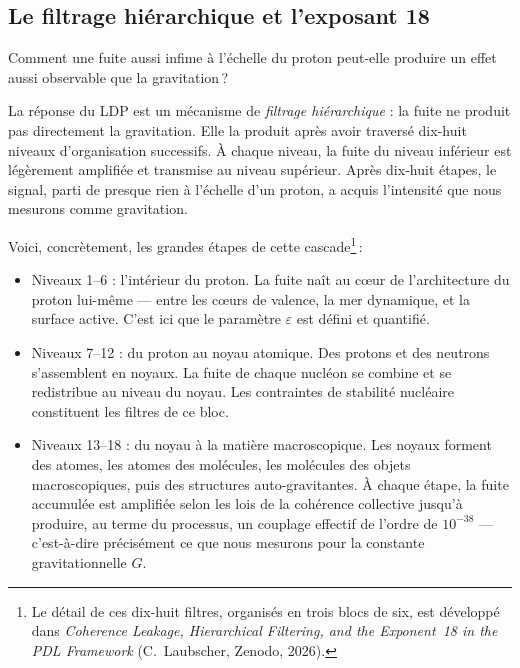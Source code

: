 \documentclass[12pt, a4paper, openright]{book}
\begin{document}
\subsection*{Le filtrage hiérarchique et l'exposant 18}

Comment une fuite aussi infime à l'échelle du proton peut-elle produire un effet aussi observable que la gravitation\,?

La réponse du LDP est un mécanisme de \emph{filtrage hiérarchique} : la fuite ne produit pas directement la gravitation. Elle la produit après avoir traversé dix-huit niveaux d'organisation successifs. À chaque niveau, la fuite du niveau inférieur est légèrement amplifiée et transmise au niveau supérieur. Après dix-huit étapes, le signal, parti de presque rien à l'échelle d'un proton, a acquis l'intensité que nous mesurons comme gravitation.

Voici, concrètement, les grandes étapes de cette cascade\footnote{%
  Le détail de ces dix-huit filtres, organisés en trois blocs de six, est développé dans \emph{Coherence Leakage, Hierarchical Filtering, and the Exponent~18 in the PDL Framework} (C.\ Laubscher, Zenodo, 2026).}\,:

\begin{itemize}
  \item Niveaux 1--6 : l'intérieur du proton.
    La fuite naît au c\oe{}ur de l'architecture du proton lui-même --- entre les c\oe{}urs de valence, la mer dynamique, et la surface active. C'est ici que le paramètre $\varepsilon$ est défini et quantifié.
  \item Niveaux 7--12 : du proton au noyau atomique.
    Des protons et des neutrons s'assemblent en noyaux. La fuite de chaque nucléon se combine et se redistribue au niveau du noyau. Les contraintes de stabilité nucléaire constituent les filtres de ce bloc.
  \item Niveaux 13--18 : du noyau à la matière macroscopique. 
    Les noyaux forment des atomes, les atomes des molécules, les molécules des objets macroscopiques, puis des structures auto-gravitantes. À chaque étape, la fuite accumulée est amplifiée selon les lois de la cohérence collective jusqu'à produire, au terme du processus, un couplage effectif de l'ordre de $10^{-38}$ --- c'est-à-dire précisément ce que nous mesurons pour la constante gravitationnelle $G$.
\end{itemize}

\medskip
\end{document}
